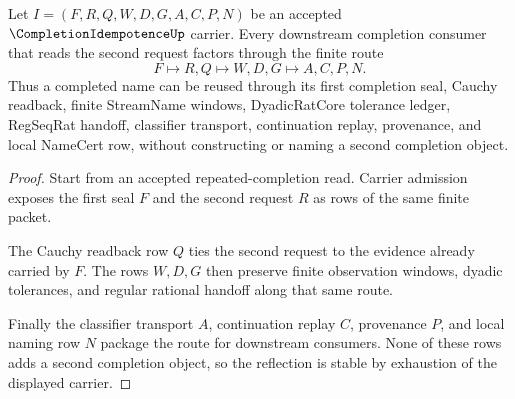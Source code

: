 \begin{theorem}
\label{thm:completion-idempotence-stable-reflection}
Let $I=(F,R,Q,W,D,G,A,C,P,N)$ be an accepted $\CompletionIdempotenceUp$ carrier. Every downstream completion consumer that reads the second request factors through the finite route
$$
F \longmapsto R,Q \longmapsto W,D,G \longmapsto A,C,P,N .
$$
Thus a completed name can be reused through its first completion seal, Cauchy readback, finite StreamName windows, DyadicRatCore tolerance ledger, RegSeqRat handoff, classifier transport, continuation replay, provenance, and local NameCert row, without constructing or naming a second completion object.
\end{theorem}
\begin{proof}
Start from an accepted repeated-completion read. Carrier admission exposes the first seal $F$ and the second request $R$ as rows of the same finite packet.

The Cauchy readback row $Q$ ties the second request to the evidence already carried by $F$. The rows $W,D,G$ then preserve finite observation windows, dyadic tolerances, and regular rational handoff along that same route.

Finally the classifier transport $A$, continuation replay $C$, provenance $P$, and local naming row $N$ package the route for downstream consumers. None of these rows adds a second completion object, so the reflection is stable by exhaustion of the displayed carrier.
\end{proof}


\begin{closurestatus}{\CompletionIdempotenceUp}
  \theoryclosure{\seedClosure}
  \formalstatus{\unformalizedV}
\end{closurestatus}
